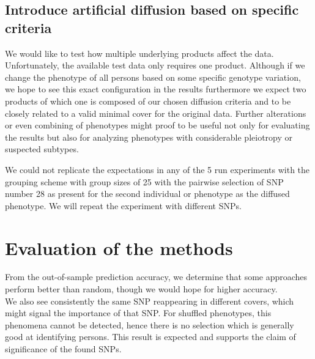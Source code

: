 \documentclass[letterpaper, 11pt]{article}
\begin{document}
\subsection{Introduce artificial diffusion based on specific criteria}
We would like to test how multiple underlying products affect the data. Unfortunately, the available test data only requires one product. Although if we change the phenotype of all persons based on some specific genotype variation, we hope to see this exact configuration in the results furthermore we expect two products of which one is composed of our chosen diffusion criteria and to be closely related to a valid minimal cover for the original data. Further alterations or even combining of phenotypes might proof to be useful not only for evaluating the results but also for analyzing phenotypes with considerable pleiotropy or suspected subtypes.

We could not replicate the expectations in any of the 5 run experiments with the grouping scheme with group sizes of 25 with the pairwise selection of SNP number 28 as present for the second individual or phenotype as the diffused phenotype. We will repeat the experiment with different SNPs. 

\section{Evaluation of the methods}
From the out-of-sample prediction accuracy, we determine that some approaches perform better than random, though we would hope for higher accuracy. \\

We also see consistently the same SNP reappearing in different covers, which might signal the importance of that SNP. For shuffled phenotypes, this phenomena cannot be detected, hence there is no selection which is generally good at identifying persons. 
This result is expected and supports the claim of significance of the found SNPs.
\end{document}

